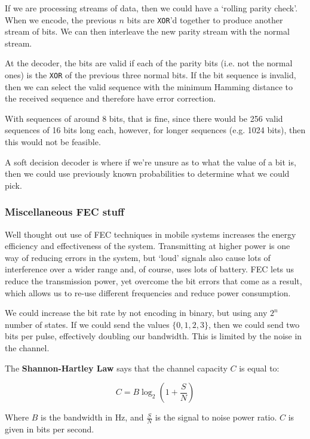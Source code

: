 If we are processing streams of data, then we could have a `rolling parity
check'. When we encode, the previous $n$ bits are \texttt{XOR}'d together to
produce another stream of bits. We can then interleave the new parity stream
with the normal stream.

At the decoder, the bits are valid if each of the parity bits (i.e. not the
normal ones) is the \texttt{XOR} of the previous three normal bits. If the bit
sequence is invalid, then we can select the valid sequence with the minimum
Hamming distance to the received sequence and therefore have error correction.

With sequences of around 8 bits, that is fine, since there would be 256 valid
sequences of 16 bits long each, however, for longer sequences (e.g. 1024 bits),
then this would not be feasible.


A soft decision decoder is where if we're unsure as to what the value of a bit
is, then we could use previously known probabilities to determine what we could
pick.


\subsubsection{Miscellaneous FEC stuff}

Well thought out use of FEC techniques in mobile systems increases the energy
efficiency and effectiveness of the system. Transmitting at higher power is one
way of reducing errors in the system, but `loud' signals also cause lots of
interference over a wider range and, of course, uses lots of battery. FEC lets
us reduce the transmission power, yet overcome the bit errors that come as a
result, which allows us to re-use different frequencies and reduce power
consumption.

We could increase the bit rate by not encoding in binary, but using any $2^n$
number of states. If we could send the values $\{0,1,2,3\}$, then we could send
two bits per pulse, effectively doubling our bandwidth. This is limited by the
noise in the channel.

The \textbf{Shannon-Hartley Law} says that the channel capacity $C$ is equal to:

\[
  C = B \log_2(1 + \frac{S}{N})
\]

Where $B$ is the bandwidth in $\si{\hertz}$, and $\frac{S}{N}$ is the signal to
noise power ratio. $C$ is given in bits per second.

